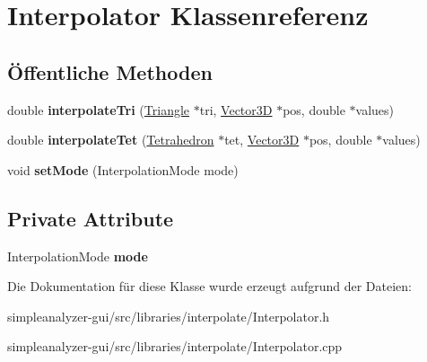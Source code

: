 \hypertarget{classInterpolator}{\section{Interpolator Klassenreferenz}
\label{classInterpolator}
}
\subsection*{Öffentliche Methoden}
\begin{DoxyCompactItemize}
\item 
\hypertarget{classInterpolator_ad59ac6ed3822e08a67ac7d1ee88a5bd2}{double {\bfseries interpolate\-Tri} (\hyperlink{classTriangle}{Triangle} $\ast$tri, \hyperlink{classVector3D}{Vector3\-D} $\ast$pos, double $\ast$values)}\label{classInterpolator_ad59ac6ed3822e08a67ac7d1ee88a5bd2}

\item 
\hypertarget{classInterpolator_a30e714ca6dff9b5745d029f95af1420a}{double {\bfseries interpolate\-Tet} (\hyperlink{classTetrahedron}{Tetrahedron} $\ast$tet, \hyperlink{classVector3D}{Vector3\-D} $\ast$pos, double $\ast$values)}\label{classInterpolator_a30e714ca6dff9b5745d029f95af1420a}

\item 
\hypertarget{classInterpolator_a2f9927fc580de7d2f94d85e6ca3ee3e3}{void {\bfseries set\-Mode} (Interpolation\-Mode mode)}\label{classInterpolator_a2f9927fc580de7d2f94d85e6ca3ee3e3}

\end{DoxyCompactItemize}
\subsection*{Private Attribute}
\begin{DoxyCompactItemize}
\item 
\hypertarget{classInterpolator_ace34e7696bdf4a1f0544b145efee898e}{Interpolation\-Mode {\bfseries mode}}\label{classInterpolator_ace34e7696bdf4a1f0544b145efee898e}

\end{DoxyCompactItemize}


Die Dokumentation für diese Klasse wurde erzeugt aufgrund der Dateien\-:\begin{DoxyCompactItemize}
\item 
simpleanalyzer-\/gui/src/libraries/interpolate/Interpolator.\-h\item 
simpleanalyzer-\/gui/src/libraries/interpolate/Interpolator.\-cpp\end{DoxyCompactItemize}
